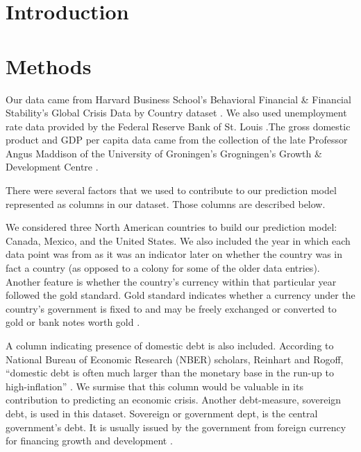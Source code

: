 \documentclass[12pt]{article}
\begin{document}
\maketitle

\begin{abstract}

\end{abstract}


\section{Introduction}

\section{Methods}
Our data came from Harvard Business School’s Behavioral Financial & Financial Stability’s Global Crisis Data by Country dataset \cite{harvard}. We also used unemployment rate data provided by the Federal Reserve Bank of St. Louis \cite{fred}.The gross domestic product and GDP per capita data came from the collection of the late Professor Angus Maddison of the University of Groningen’s Grogningen’s Growth & Development Centre \cite{ggdc}.

There were several factors that we used to contribute to our prediction model represented as columns in our dataset. Those columns are described below.

We considered three North American countries to build our prediction model: Canada, Mexico, and the United States. We also included the year in which each data point was from as it was an indicator later on whether the country was in fact a country (as opposed to a colony for some of the older data entries). 
Another feature is whether the country’s currency within that particular year followed the gold standard. Gold standard indicates whether a currency under the country’s government is fixed to and may be freely exchanged or converted to gold or bank notes worth gold \cite{chengold}.

A column indicating presence of domestic debt is also included. According to National Bureau of Economic Research (NBER) scholars, Reinhart and Rogoff, “domestic debt is often much larger than the monetary base in the run-up to high-inflation” \cite{nber}. We surmise that this column would be valuable in its contribution to predicting an economic crisis. Another debt-measure, sovereign debt, is used in this dataset. Sovereign or government dept, is the central government's debt. It is usually issued by the government from foreign currency for financing growth and development \cite{chensovereign}.
\end{document}
